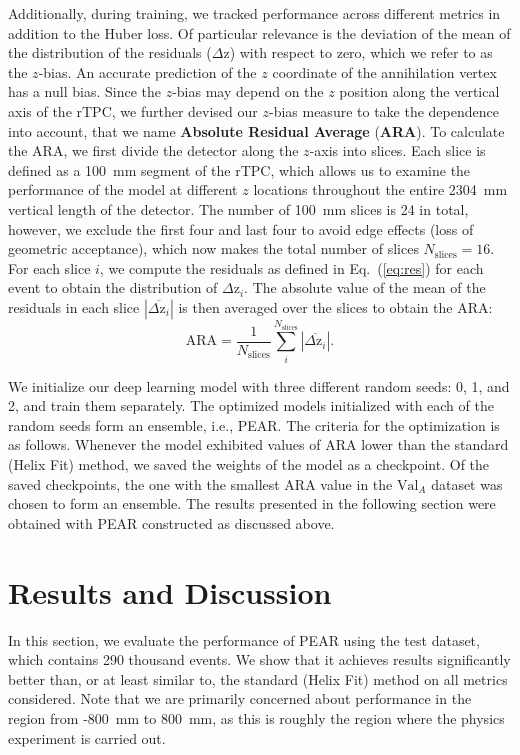 \documentclass[a4paper,11pt]{article}
\begin{document}
Additionally, during training, we tracked performance across different metrics in addition to the Huber loss. Of particular relevance is the deviation of the mean of the distribution of the residuals ($\Delta\mathrm{z}$) with respect to zero, which we refer to as the $z$-bias. An accurate prediction of the $z$ coordinate of the annihilation vertex has a null bias. Since the $z$-bias may depend on the $z$ position along the vertical axis of the rTPC, we further devised our $z$-bias measure to take the dependence into account, that we name \textbf{Absolute Residual Average} (\textbf{ARA}). To calculate the ARA, we first divide the detector along the $z$-axis into slices. Each slice is defined as a 100~mm segment of the rTPC, which allows us to examine the performance of the model at different $z$ locations throughout the entire 2304~mm vertical length of the detector. The number of 100~mm slices is 24 in total, however, we exclude the first four and last four to avoid edge effects (loss of geometric acceptance), which now makes the total number of slices $N_{\mathrm{slices}} = 16$. For each slice $i$, we compute the residuals as defined in Eq.~(\ref{eq:res}) for each event to obtain the distribution of $\Delta\mathrm{z}_i$. The absolute value of the mean of the residuals in each slice $|\overline{\Delta \mathrm{z}_i}|$ is then averaged over the slices to obtain the ARA:
\begin{equation}
    \label{eq:overall_bias}
    \mathrm{ARA} = \frac{1}{N_{\mathrm{slices}}}\sum_{i}^{N_{\mathrm{slices}}} |\overline{\Delta \mathrm{z}_i}|.
\end{equation}

We initialize our deep learning model with three different random seeds: 0, 1, and 2, and train them separately. The optimized models initialized with each of the random seeds form an ensemble, i.e., PEAR. The criteria for the optimization is as follows. Whenever the model exhibited values of ARA lower than the standard (Helix Fit) method, we saved the weights of the model as a checkpoint. Of the saved checkpoints, the one with the smallest ARA value in the $\mathrm{Val}_{A}$ dataset was chosen to form an ensemble. The results presented in the following section were obtained with PEAR constructed as discussed above.

\section{\label{sec:results}Results and Discussion}
In this section, we evaluate the performance of PEAR using the test dataset, which contains 290 thousand events. We show that it achieves results significantly better than, or at least similar to, the standard (Helix Fit) method on all metrics considered. Note that we are primarily concerned about performance in the region from -800~mm to 800~mm, as this is roughly the region where the physics experiment is carried out. 
\end{document}
